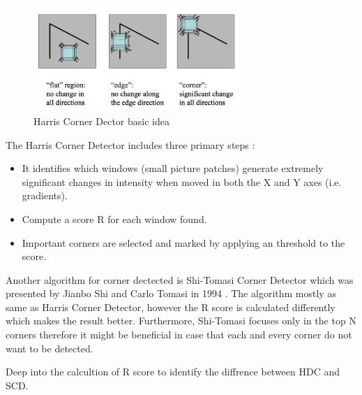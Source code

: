 \documentclass[a4paper, 12pt]{article}
\begin{document}
\begin{figure}[H]
    \centering
    \includegraphics[width=0.7\textwidth]{Basic idea of Harris Corner Detector.png}
    \caption{Harris Corner Dector basic idea}
    \label{Figure X}
\end{figure}

The Harris Corner Detector includes three primary steps \citep{ryu2011formula}:

\begin{itemize}
    \item It identifies which windows (small picture patches) generate extremely significant changes in intensity when moved in both the X and Y axes (i.e. gradients).
    \item Compute a score R for each window found.
    \item Important corners are selected and marked by applying an threshold to the score.
\end{itemize}

Another algorithm for corner dectected is Shi-Tomasi Corner Detector which was presented by Jianbo Shi and Carlo Tomasi in 1994 \citep{shi1994good}. The algorithm mostly as same as Harris Corner Detector, however the R score is calculated differently which makes the result better. Furthermore, Shi-Tomasi focuses only in the top N corners therefore it might be beneficial in case that each and every corner do not want to be detected.

Deep into the calcultion of R score to identify the diffrence between HDC and SCD.

\begin{table}[ht!]
    \centering
    \def\arraystretch{1}%
    \caption{HDC vs SDC Scoring function}
    \label{table:1}
\end{table}
\end{document}
